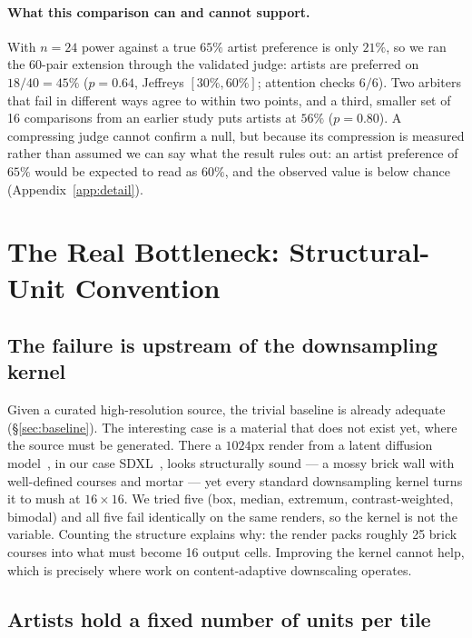 \documentclass{article}
\begin{document}
\paragraph{What this comparison can and cannot support.} With $n{=}24$ power
against a true $65\%$ artist preference is only $21\%$, so we ran the 60-pair
extension through the validated judge: artists are preferred on $18/40 = 45\%$
($p{=}0.64$, Jeffreys $[30\%,60\%]$; attention checks $6/6$). Two arbiters
that fail in different ways agree to within two points, and a third, smaller
set of 16 comparisons from an earlier study puts artists at $56\%$
($p{=}0.80$). A compressing judge
cannot confirm a null, but because its compression is measured rather than
assumed we can say what the result rules out: an artist preference of $65\%$
would be expected to read as $60\%$, and the observed value is below chance
(Appendix~\ref{app:detail}).


\section{The Real Bottleneck: Structural-Unit Convention}
\label{sec:mechanism}

\subsection{The failure is upstream of the downsampling kernel}

Given a curated high-resolution source, the trivial baseline is already
adequate (\S\ref{sec:baseline}). The interesting case is a material that does
not exist yet, where the source must be generated. There a $1024$px render
from a latent diffusion model~\citep{rombach2022ldm}, in our case
SDXL~\citep{podell2024sdxl}, looks structurally sound --- a mossy brick wall
with well-defined courses and mortar --- yet every standard downsampling
kernel turns it to mush at $16\times16$. We tried five (box, median, extremum,
contrast-weighted, bimodal) and all five fail identically on the same renders,
so the kernel is not the variable. Counting the structure explains why: the
render packs roughly 25 brick courses into what must become 16 output cells.
Improving the kernel cannot help, which is precisely where work on
content-adaptive downscaling operates.

\subsection{Artists hold a fixed number of units per tile}
\end{document}
